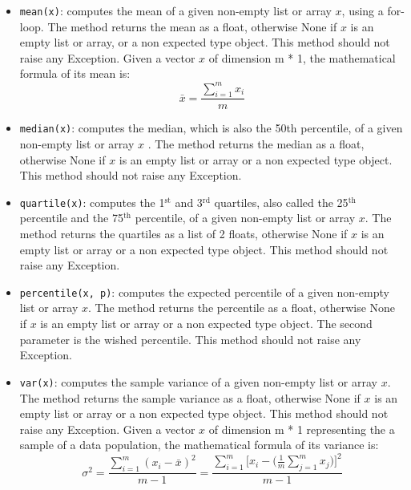 \begin{itemize}
  \item \texttt{mean(x)}: computes the mean of a given non-empty list or array $x$, using a for-loop.
        The method returns the mean as a float, otherwise None if $x$ is an empty list or array,
        or a non expected type object.
        This method should not raise any Exception.
        \newline
        Given a vector $x$ of dimension m * 1, the mathematical formula of its mean is:
        $$
        \bar{x} = \frac{\sum_{i = 1}^{m}{x_i}}{m}
        $$

  \item \texttt{median(x)}: computes the median, which is also the 50th percentile, of a given non-empty list or array $x$ .
        The method returns the median as a float,
        otherwise None if $x$ is an empty list or array or a non expected type object.
        This method should not raise any Exception.

  \item \texttt{quartile(x)}: computes the 1$^\text{st}$ and 3$^\text{rd}$ quartiles,
        also called the 25$^\text{th}$ percentile and the 75$^\text{th}$ percentile, of a given non-empty list or array $x$.
        The method returns the quartiles as a list of 2 floats,
        otherwise None if $x$ is an empty list or array or a non expected type object.
        This method should not raise any Exception.

  \item \texttt{percentile(x, p)}: computes the expected percentile of a given non-empty list or array $x$.
        The method returns the percentile as a float,
        otherwise None if $x$ is an empty list or array or a non expected type object.
        The second parameter is the wished percentile.
        This method should not raise any Exception.

  \item \texttt{var(x)}: computes the sample variance of a given non-empty list or array $x$.
        The method returns the sample variance as a float,
        otherwise None if $x$ is an empty list or array or a non expected type object.
        This method should not raise any Exception.
        \newline
        Given a vector $x$ of dimension m * 1 representing the a sample of a data population, the mathematical formula of its variance is:
        $$
        \sigma^2 = \frac{\sum_{i = 1}^{m}{(x_i - \bar{x})^2}}{m - 1} = \frac{\sum_{i = 1}^{m}{[x_i - (\frac{1}{m}\sum_{j = 1}^{m}{x_j}})]^2}{m - 1}
        $$


\end{itemize}
